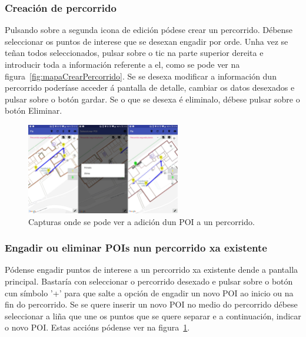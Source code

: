 \subsubsection{Creación de percorrido}
Pulsando sobre a segunda icona de edición pódese crear un percorrido. Débense seleccionar os puntos de interese que se desexan engadir por orde. Unha vez se teñan todos seleccionados, pulsar sobre o tic na parte superior dereita e introducir toda a información referente a el, como se pode ver na figura~\ref{fig:mapaCrearPercorrido}. Se se desexa modificar a información dun percorrido poderíase acceder á pantalla de detalle, cambiar os datos desexados e pulsar sobre o botón gardar. Se o que se desexa é eliminalo, débese pulsar sobre o botón Eliminar.

\begin{figure}[h]
	\begin{center}
		\includegraphics[width=0.6\textwidth]{figures/android/mapaEngadirPoiPercorrido}
		\caption{Capturas onde se pode ver a adición dun POI a un percorrido.}
		\label{fig:mapaEngadirPoiPercorrido}
	\end{center}
\end{figure}

\subsubsection{Engadir ou eliminar POIs nun percorrido xa existente}
Pódense engadir puntos de interese a un percorrido xa existente dende a pantalla principal. Bastaría con seleccionar o percorrido desexado e pulsar sobre o botón cun símbolo '+' para que salte a opción de engadir un novo POI ao inicio ou na fin do percorrido. Se se quere inserir un novo POI no medio do percorrido débese seleccionar a liña que une os puntos que se quere separar e a continuación, indicar o novo POI. Estas accións pódense ver na figura~\ref{fig:mapaEngadirPoiPercorrido}.

